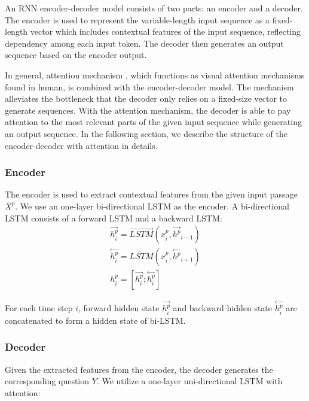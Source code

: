 \documentclass[letterpaper]{article} %
\begin{document}
An RNN encoder-decoder model consists of two parts: an encoder and a decoder. The encoder is used to represent the variable-length input sequence as a fixed-length vector which includes contextual features of the input sequence, reflecting dependency among each input token. The decoder then generates an output sequence based on the encoder output.
%
%

In general, attention mechanism \cite{bahdanau2014neural}, which functions as visual attention mechanisms found in human, is combined with the encoder-decoder model. The mechanism alleviates the bottleneck that the decoder only relies on a fixed-size vector to generate sequences. With the attention mechanism, the decoder is able to pay attention to the most relevant parts of the given input sequence while generating an output sequence. In the following section, we describe the structure of the encoder-decoder with attention in details.
%
%
%

\subsubsection{Encoder}
The encoder is used to extract contextual features from the given input passage \(X^p\). We use an one-layer bi-directional LSTM as the encoder. A bi-directional LSTM consists of a forward LSTM and a backward LSTM:
\begin{gather}
\overset{\rightarrow}{h^p_i} = \overrightarrow{LSTM}(x^p_i, \overset{\rightarrow}{h^p}_{i-1})  \label{eq_3} \\
\overset{\leftarrow}{h^p_i} = \overleftarrow{LSTM}(x^p_i, \overset{\leftarrow}{h^p}_{i+1})  \label{eq_4} \\
h^p_i = [\overset{\rightarrow}{h^p_i};\overset{\leftarrow}{h^p_i}] \label{eq_5}
\end{gather}

For each time step \(i\), forward hidden state \(\overset{\rightarrow}{h^p_i}\) and backward hidden state \(\overset{\leftarrow}{h^p_i}\) are concatenated to form a hidden state of bi-LSTM.

\subsubsection{Decoder}
Given the extracted features from the encoder, the decoder generates the corresponding question \(Y\). We utilize a one-layer uni-directional LSTM with attention:
\end{document}
